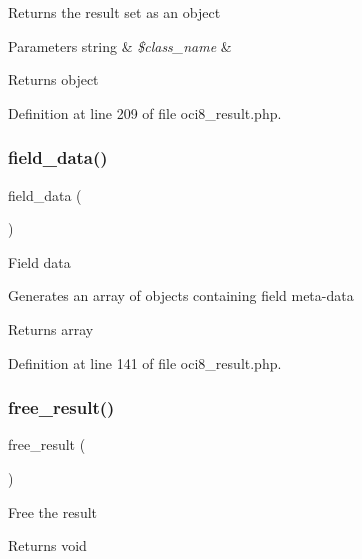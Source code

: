 Returns the result set as an object


\begin{DoxyParams}[1]{Parameters}
string & {\em \$class\+\_\+name} & \\
\hline
\end{DoxyParams}
\begin{DoxyReturn}{Returns}
object 
\end{DoxyReturn}


Definition at line 209 of file oci8\+\_\+result.\+php.

\mbox{\label{class_c_i___d_b__oci8__result_a84bffd65e53902ade1591716749a33e3}} 
\subsubsection{\texorpdfstring{field\_data()}{field\_data()}}
{\footnotesize\ttfamily field\+\_\+data (\begin{DoxyParamCaption}{ }\end{DoxyParamCaption})}

Field data

Generates an array of objects containing field meta-\/data

\begin{DoxyReturn}{Returns}
array 
\end{DoxyReturn}


Definition at line 141 of file oci8\+\_\+result.\+php.

\mbox{\label{class_c_i___d_b__oci8__result_aad2d98d6beb3d6095405356c6107b473}} 
\subsubsection{\texorpdfstring{free\_result()}{free\_result()}}
{\footnotesize\ttfamily free\+\_\+result (\begin{DoxyParamCaption}{ }\end{DoxyParamCaption})}

Free the result

\begin{DoxyReturn}{Returns}
void 
\end{DoxyReturn}



